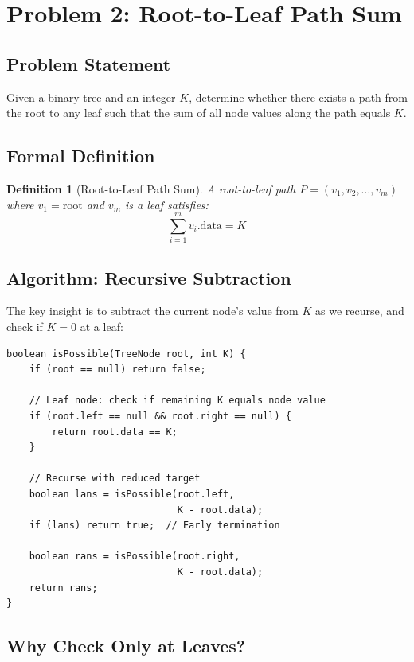 \documentclass[10pt,journal,compsoc,onecolumn]{IEEEtran}
\newtheorem{definition}[theorem]{Definition}
\begin{document}
\section{Problem 2: Root-to-Leaf Path Sum}
\label{sec:pathsum}

\subsection{Problem Statement}

Given a binary tree and an integer $K$, determine whether there exists a path from the root to any leaf such that the sum of all node values along the path equals $K$.

\subsection{Formal Definition}

\begin{definition}[Root-to-Leaf Path Sum]
A root-to-leaf path $P = (v_1, v_2, \ldots, v_m)$ where $v_1 = \text{root}$ and $v_m$ is a leaf satisfies:
\[
\sum_{i=1}^{m} v_i.\text{data} = K
\]
\end{definition}

\subsection{Algorithm: Recursive Subtraction}

The key insight is to subtract the current node's value from $K$ as we recurse, and check if $K = 0$ at a leaf:

\begin{verbatim}
boolean isPossible(TreeNode root, int K) {
    if (root == null) return false;
    
    // Leaf node: check if remaining K equals node value
    if (root.left == null && root.right == null) {
        return root.data == K;
    }
    
    // Recurse with reduced target
    boolean lans = isPossible(root.left, 
                              K - root.data);
    if (lans) return true;  // Early termination
    
    boolean rans = isPossible(root.right, 
                              K - root.data);
    return rans;
}
\end{verbatim}

\subsection{Why Check Only at Leaves?}
\end{document}
